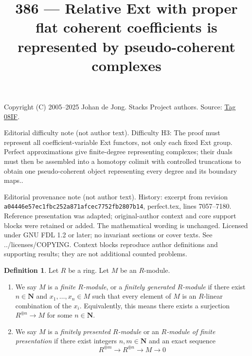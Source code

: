 \documentclass{amsart}
\theoremstyle{plain}
\theoremstyle{definition}
\newtheorem{definition}[subsection]{Definition}
\theoremstyle{remark}
\numberwithin{equation}{subsection}
\begin{document}
\title[Stacks Project, Tag 08IF]{386 --- Relative Ext with proper flat coherent coefficients is represented by pseudo-coherent complexes}
\maketitle
\noindent Copyright (C) 2005--2025 Johan de Jong. Stacks Project authors. Source: \href{https://stacks.math.columbia.edu/tag/08IF}{Tag 08IF}.

\noindent Editorial difficulty note (not author text). Difficulty H3: The proof must represent all coefficient-variable Ext functors, not only each fixed Ext group. Perfect approximations give finite-degree representing complexes; their duals must then be assembled into a homotopy colimit with controlled truncations to obtain one pseudo-coherent object representing every degree and its boundary maps..

\noindent Editorial provenance note (not author text). History: excerpt from revision \texttt{a0444\allowbreak 6e57e\allowbreak c1fbc\allowbreak 252a8\allowbreak 71afc\allowbreak ec775\allowbreak 2fb28\allowbreak 07b14}, perfect.tex, lines 7057--7180. Reference presentation was adapted; original-author context and core support blocks were retained or added. The mathematical wording is unchanged. Licensed under GNU FDL 1.2 or later; no invariant sections or cover texts. See ../licenses/COPYING. Context blocks reproduce author definitions and supporting results; they are not additional counted problems.

\begin{definition}
\label{algebra-definition-module-finite-type}
Let $R$ be a ring. Let $M$ be an $R$-module.
\begin{enumerate}
\item We say $M$ is a {\it finite $R$-module}, or a {\it finitely generated
$R$-module} if there exist $n \in \mathbf{N}$ and $x_1, \ldots, x_n \in M$
such that every element of $M$ is an $R$-linear combination of the $x_i$.
Equivalently, this means there exists a surjection
$R^{\oplus n} \to M$ for some $n \in \mathbf{N}$.
\item We say $M$ is a {\it finitely presented $R$-module} or an
{\it $R$-module of finite presentation} if there exist integers
$n, m \in \mathbf{N}$ and an exact sequence
$$
R^{\oplus m} \longrightarrow R^{\oplus n} \longrightarrow M \longrightarrow 0
$$
\end{enumerate}
\end{definition}
\end{document}
